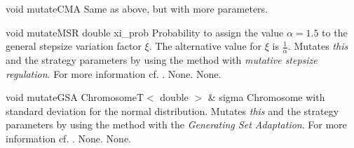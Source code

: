 \vspace*{4ex}

\setNormalInstance
\setCorrectWidthThree{8pt}
\printMethodWithParamsSaved
{void}
{}
{mutateCMA}
{Same as above, but with more parameters.}
{}
\setCorrectWidthThree{4pt}

\vspace*{4ex}

\setNormalInstance
\printMethodWithOneParam
{void}
{mutateMSR}
{double}
{xi\_prob}
{Probability to assign the value $\alpha = 1.5$ to the general
 stepsize variation factor $\xi$. The alternative value for
 $\xi$ is $\frac{1}{\alpha}$.}
{Mutates {\em this} and the strategy parameters by using the method
 with {\em mutative stepsize regulation}.
 For more information cf. \cite{MSR}.}
{None.}
{None.}

\clearpage

\setNormalInstance
\printMethodWithOneParam
{void}
{mutateGSA}
{ChromosomeT$<$ double $>$ \&}
{sigma}
{Chromosome with standard deviation for the normal distribution.}
{Mutates {\em this} and the strategy parameters by using the method
 with the {\em Generating Set Adaptation}.
 For more information cf. \cite{GSA}.}
{None.}
{None.}

\vspace*{4ex}

